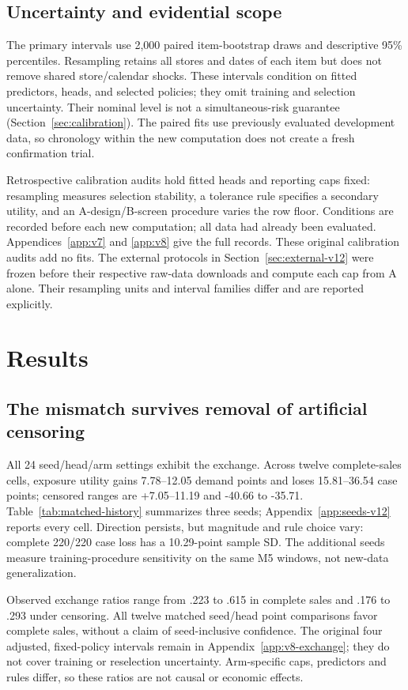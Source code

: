 \documentclass{article}
\begin{document}
\subsection{Uncertainty and evidential scope}
The primary intervals use 2,000 paired item-bootstrap draws and descriptive 95\% percentiles. Resampling retains all stores and dates of each item but does not remove shared store/calendar shocks. These intervals condition on fitted predictors, heads, and selected policies; they omit training and selection uncertainty. Their nominal level is not a simultaneous-risk guarantee (Section~\ref{sec:calibration}). The paired fits use previously evaluated development data, so chronology within the new computation does not create a fresh confirmation trial.

Retrospective calibration audits hold fitted heads and reporting caps fixed: resampling measures selection stability, a tolerance rule specifies a secondary utility, and an A-design/B-screen procedure varies the row floor. Conditions are recorded before each new computation; all data had already been evaluated. Appendices~\ref{app:v7} and \ref{app:v8} give the full records. These original calibration audits add no fits. The external protocols in Section~\ref{sec:external-v12} were frozen before their respective raw-data downloads and compute each cap from A alone. Their resampling units and interval families differ and are reported explicitly.

\section{Results}
\subsection{The mismatch survives removal of artificial censoring}
\label{sec:matched}

All 24 seed/head/arm settings exhibit the exchange. Across twelve complete-sales cells, exposure utility gains 7.78--12.05 demand points and loses 15.81--36.54 case points; censored ranges are +7.05--11.19 and -40.66 to -35.71. Table~\ref{tab:matched-history} summarizes three seeds; Appendix~\ref{app:seeds-v12} reports every cell. Direction persists, but magnitude and rule choice vary: complete 220/220 case loss has a 10.29-point sample SD. The additional seeds measure training-procedure sensitivity on the same M5 windows, not new-data generalization.

Observed exchange ratios range from .223 to .615 in complete sales and .176 to .293 under censoring. All twelve matched seed/head point comparisons favor complete sales, without a claim of seed-inclusive confidence. The original four adjusted, fixed-policy intervals remain in Appendix~\ref{app:v8-exchange}; they do not cover training or reselection uncertainty. Arm-specific caps, predictors and rules differ, so these ratios are not causal or economic effects.
\end{document}

